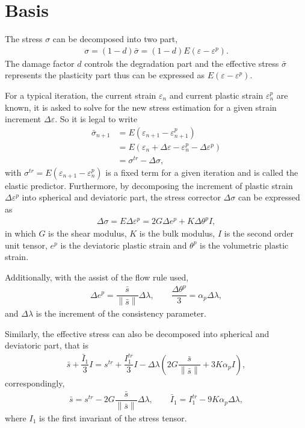 \documentclass[5p]{elsarticle}
\newcommand*{\norm}[1]{\left\lVert#1\right\rVert}
\begin{document}
\section{Basis}
The stress $\sigma$ can be decomposed into two part,
\begin{gather*}
\sigma=\left(1-d\right)\bar{\sigma}=\left(1-d\right)E\left(\varepsilon-\varepsilon^p\right).
\end{gather*}
The damage factor $d$ controls the degradation part and the effective stress $\bar{\sigma}$ represents the plasticity part thus can be expressed as $E\left(\varepsilon-\varepsilon^p\right)$.

For a typical iteration, the current strain $\varepsilon_n$ and current plastic strain $\varepsilon^p_n$ are known, it is asked to solve for the new stress estimation for a given strain increment $\Delta\varepsilon$. So it is legal to write
\begin{equation}
\begin{split}
\bar{\sigma}_{n+1}&=E\left(\varepsilon_{n+1}-\varepsilon_{n+1}^p\right)\\&=E\left(\varepsilon_{n}+\Delta\varepsilon-\varepsilon_n^p-\Delta\varepsilon^p\right)\\&=\sigma^{tr}-\Delta\sigma,
\end{split}
\end{equation}
with $\sigma^{tr}=E\left(\varepsilon_{n+1}-\varepsilon_n^p\right)$ is a fixed term for a given iteration and is called the elastic predictor. Furthermore, by decomposing the increment of plastic strain $\Delta\varepsilon^p$ into spherical and deviatoric part, the stress corrector $\Delta\sigma$ can be expressed as
\begin{gather*}
\Delta\sigma=E\Delta\varepsilon^p=2G\Delta{}e^p+K\Delta\theta^pI,
\end{gather*}
in which $G$ is the shear modulus, $K$ is the bulk modulus, $I$ is the second order unit tensor, $e^p$ is the deviatoric plastic strain and $\theta^p$ is the volumetric plastic strain.

Additionally, with the assist of the flow rule used,
\begin{gather*}
\Delta{}e^p=\dfrac{\bar{s}}{\norm{\bar{s}}}\Delta\lambda,\qquad
\dfrac{\Delta\theta^p}{3}=\alpha_p\Delta\lambda,
\end{gather*}
and $\Delta\lambda$ is the increment of the consistency parameter.

Similarly, the effective stress can also be decomposed into spherical and deviatoric part, that is
\begin{gather*}
\bar{s}+\dfrac{\bar{I}_1}{3}I=s^{tr}+\dfrac{I_1^{tr}}{3}I-\Delta\lambda\left(2G\dfrac{\bar{s}}{\norm{\bar{s}}}+3K\alpha_pI\right),
\end{gather*}
correspondingly,
\begin{gather*}
\bar{s}=s^{tr}-2G\dfrac{\bar{s}}{\norm{\bar{s}}}\Delta\lambda,\qquad
\bar{I}_1=I_1^{tr}-9K\alpha_p\Delta\lambda,
\end{gather*}
where $I_1$ is the first invariant of the stress tensor.
\end{document}
